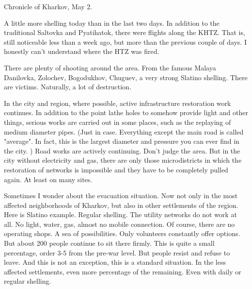  
 
 
 
 

Chronicle of Kharkov, May 2.

A little more shelling today than in the last two days. In addition to the
traditional Saltovka and Pyatihatok, there were flights along the KHTZ. That
is, still noticeable less than a week ago, but more than the previous couple of
days. I honestly can't understand where the HTZ was fired.

There are plenty of shooting around the area. From the famous Malaya Danilovka,
Zolochev, Bogodukhov, Chuguev, a very strong Slatino shelling. There are
victims. Naturally, a lot of destruction.

In the city and region, where possible, active infrastructure restoration work
continues. In addition to the point lathe holes to somehow provide light and
other things, serious works are carried out in some places, such as the
replaying of medium diameter pipes. (Just in case. Everything except the main
road is called "average". In fact, this is the largest diameter and pressure
you can ever find in the city. ) Road works are actively continuing. Don't
judge the area. But in the city without electricity and gas, there are only
those microdistricts in which the restoration of networks is impossible and
they have to be completely pulled again. At least on many sites.

Sometimes I wonder about the evacuation situation. Now not only in the most
affected neighborhoods of Kharkov, but also in other settlements of the region.
Here is Slatino example. Regular shelling. The utility networks do not work at
all. No light, water, gas, almost no mobile connection. Of course, there are no
operating shops. A sea of possibilities. Only volunteers constantly offer
options. But about 200 people continue to sit there firmly. This is quite a
small percentage, order 3-5 from the pre-war level. But people resist and
refuse to leave. And this is not an exception, this is a standard situation. In
the less affected settlements, even more percentage of the remaining. Even with
daily or regular shelling.

